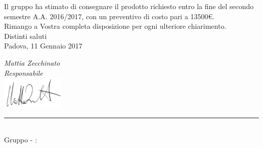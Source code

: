\begin{titlepage}
\begin{large}
	Il gruppo \GroupName{} ha stimato di consegnare il prodotto richiesto entro la fine del secondo semestre A.A. 2016/2017, con un preventivo di costo pari a 13500€.\\
	
	Rimango a Vostra completa disposizione per ogni ulteriore chiarimento. \\
	
	Distinti saluti\\
	
	\vspace{0,5cm} 
	Padova, 11 Gennaio 2017
	\begin{flushright}
		\emph{Mattia Zecchinato} \\ 
		\emph{Responsabile \GroupName{}} \\ 
		\includegraphics[width=3cm]{../../firme/MZ.png}
	\end{flushright}
	
	\end{large}
	
	\vspace{1cm} 
	\begin{center}
		\rule{13cm}{0,03cm} \\
		Gruppo \GroupName{} - \email: \GroupEmail{}
	\end{center} 
	
	
\end{titlepage}
  
 \restoregeometry
